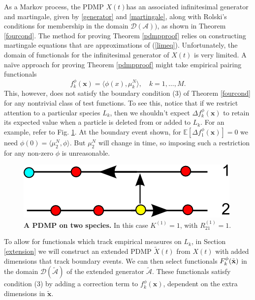 As a Markov process, the PDMP $X(t)$has an associated infinitesimal generator and martingale, given by \ref{generator} and \ref{martingale}, along with Rolski's conditions for membership in the domain $\mathcal D(\mathcal A))$, as shown in Theorem \ref{fourcond}. The method for proving Theorem \ref{pdmpproof} relies on   constructing  martingale equations that are approximations of (\ref{limeq}).  Unfortunately, the  domain of functionals for the infinitesimal generator of $X(t)$ is very limited. A na\"ive approach for proving Theorem \ref{pdmpproof} might take empirical pairing functionals \begin{equation}
f^\phi_k(\textbf{x}) = \langle \phi(x),\mu_k^N \rangle, \quad k = 1, \dots, M.
\end{equation}
 This, however, does not satisfy the boundary condition (3) of Theorem \ref{fourcond} for any nontrivial class of test functions. To see this, notice that if we restrict attention to a particular species $L_k$, then we shouldn't expect $\Delta f^\phi_k(\mathbf x)$ to retain its expected value when  a particle is deleted from or added to  $L_k$. For an example, refer to Fig. \ref{genex}. At the boundary event shown, for $\mathbb{E}[\Delta f^\phi_1(\mathbf x)]= 0$ we need $\phi(0) = \langle \mu^N_2,\phi\rangle$.  But  $\mu_2^N$ will change in time, so imposing such a restriction for any non-zero $\phi$ is unreasonable. 
\begin{figure}
\begin{centering}
\includegraphics[width=.5\textwidth]{generatorexample.png}
\caption{\textbf{A PDMP on two species.} In this case $K^{(1)} = 1$, with $R^{(1)}_{21}= 1$. }  \label{genex}     
\end{centering}
\end{figure}

To allow for functionals which track empirical measures on $L_k$, in Section \ref{extension} we will construct an extended PDMP $\tilde X(t)$ from $X(t)$ with added dimensions that track boundary events. We can then select  functionals $F^\phi_k(\tilde {\textbf x})$ in the domain   $\mathcal D(\tilde {\mathcal A})$ of the extended generator $\tilde{\mathcal A}$.  These functionals satisfy condition (3) by adding a correction term to $f^\phi_k(\textbf{x})$, dependent on the extra dimensions in $\tilde{\textbf{x}}$.

